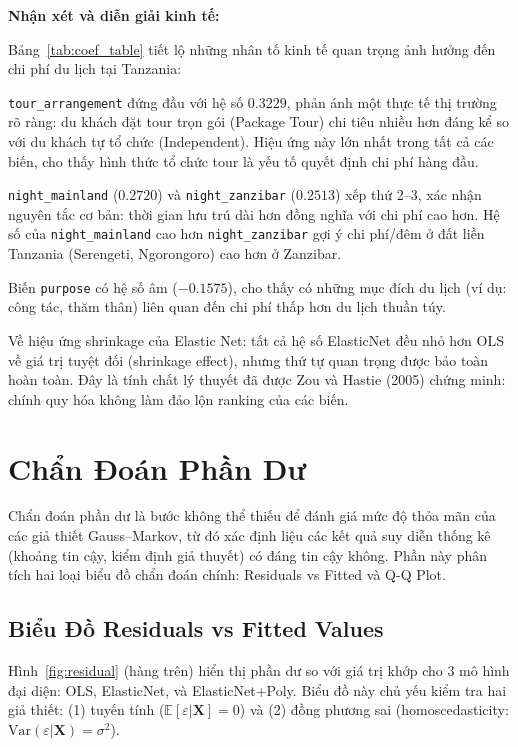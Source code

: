\documentclass[12pt,a4paper]{article}
\begin{document}
\textbf{Nhận xét và diễn giải kinh tế:}

Bảng~\ref{tab:coef_table} tiết lộ những nhân tố kinh tế quan trọng ảnh hưởng đến chi phí du lịch tại Tanzania:

\texttt{tour\_arrangement} đứng đầu với hệ số $0.3229$, phản ánh một thực tế thị trường rõ ràng: du khách đặt tour trọn gói (Package Tour) chi tiêu nhiều hơn đáng kể so với du khách tự tổ chức (Independent). Hiệu ứng này lớn nhất trong tất cả các biến, cho thấy hình thức tổ chức tour là yếu tố quyết định chi phí hàng đầu.

\texttt{night\_mainland} ($0.2720$) và \texttt{night\_zanzibar} ($0.2513$) xếp thứ 2--3, xác nhận nguyên tắc cơ bản: thời gian lưu trú dài hơn đồng nghĩa với chi phí cao hơn. Hệ số của \texttt{night\_mainland} cao hơn \texttt{night\_zanzibar} gợi ý chi phí/đêm ở đất liền Tanzania (Serengeti, Ngorongoro) cao hơn ở Zanzibar.

Biến \texttt{purpose} có hệ số âm ($-0.1575$), cho thấy có những mục đích du lịch (ví dụ: công tác, thăm thân) liên quan đến chi phí thấp hơn du lịch thuần túy.

Về hiệu ứng shrinkage của Elastic Net: tất cả hệ số ElasticNet đều nhỏ hơn OLS về giá trị tuyệt đối (shrinkage effect), nhưng thứ tự quan trọng được bảo toàn hoàn toàn. Đây là tính chất lý thuyết đã được Zou và Hastie (2005) chứng minh: chính quy hóa không làm đảo lộn ranking của các biến.

\section{Chẩn Đoán Phần Dư}

Chẩn đoán phần dư là bước không thể thiếu để đánh giá mức độ thỏa mãn của các giả thiết Gauss--Markov, từ đó xác định liệu các kết quả suy diễn thống kê (khoảng tin cậy, kiểm định giả thuyết) có đáng tin cậy không. Phần này phân tích hai loại biểu đồ chẩn đoán chính: Residuals vs Fitted và Q-Q Plot.

\subsection{Biểu Đồ Residuals vs Fitted Values}

Hình~\ref{fig:residual} (hàng trên) hiển thị phần dư so với giá trị khớp cho 3 mô hình đại diện: OLS, ElasticNet, và ElasticNet+Poly. Biểu đồ này chủ yếu kiểm tra hai giả thiết: (1) tuyến tính ($\mathbb{E}[\varepsilon|\mathbf{X}] = 0$) và (2) đồng phương sai (homoscedasticity: $\text{Var}(\varepsilon|\mathbf{X}) = \sigma^2$).
\end{document}
